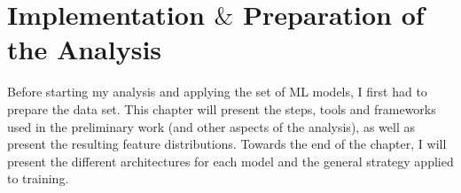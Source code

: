 \chapter{Implementation $\&$ Preparation of the Analysis}\label{chap:Implementation}
Before starting my analysis and applying the set of \ac{ML} models, I first had to prepare the data set. This chapter 
will present the steps, tools and frameworks used in the preliminary work (and other aspects of the analysis), as well as present the 
resulting feature distributions. Towards the end of the chapter, I will present the different architectures for each model and the general 
strategy applied to training.

